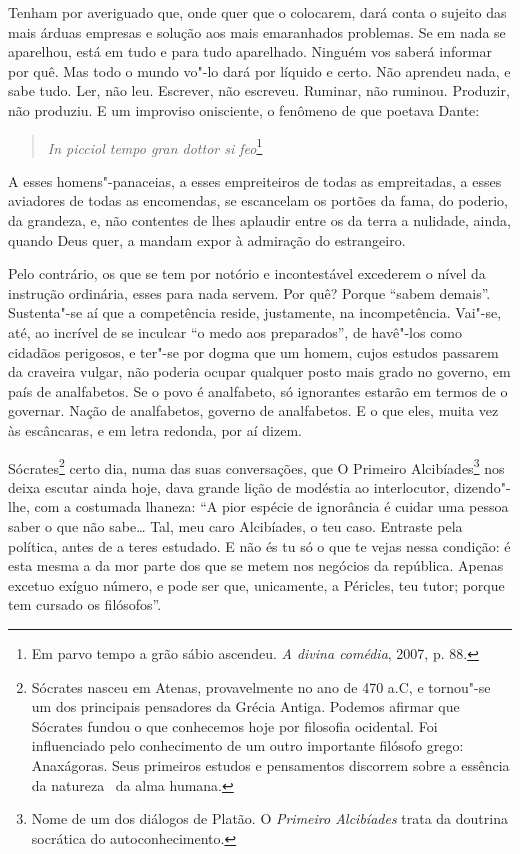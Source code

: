 Tenham por averiguado que, onde quer que o colocarem, dará conta o
sujeito das mais árduas empresas e solução aos mais emaranhados
problemas. Se em nada se aparelhou, está em tudo e para tudo
aparelhado. Ninguém vos saberá informar por quê. Mas todo o mundo vo"-lo
dará por líquido e certo. Não aprendeu nada, e sabe tudo. Ler, não leu.
Escrever, não escreveu. Ruminar, não ruminou. Produzir, não produziu. E
um improviso onisciente, o fenômeno de que poetava Dante:

\begin{verse}
\textit{In picciol tempo gran dottor si feo}\footnote{ Em parvo tempo 
a grão sábio ascendeu.  
\textit{A divina comédia}, 2007, p. 88.} 
\end{verse}
 

A esses homens"-panaceias, a esses empreiteiros de todas as
empreitadas, a esses aviadores de todas as encomendas, se escancelam os
portões da fama, do poderio, da grandeza, e, não contentes de lhes
aplaudir entre os da terra a nulidade, ainda, quando Deus quer, a
mandam expor à admiração do estrangeiro.

Pelo contrário, os que se tem por notório e incontestável
excederem o nível da instrução ordinária, esses para nada servem. Por
quê? Porque ``sabem demais''. Sustenta"-se aí
que a competência reside, justamente, na incompetência. Vai"-se, até, ao
incrível de se inculcar ``o medo aos
preparados'', de havê"-los como cidadãos perigosos, e
ter"-se por dogma que um homem, cujos estudos passarem da craveira
vulgar, não poderia ocupar qualquer posto mais grado no governo, em
país de analfabetos. Se o povo é analfabeto, só ignorantes estarão em
termos de o governar. Nação de analfabetos, governo de analfabetos. E o
que eles, muita vez às escâncaras, e em letra redonda, por aí dizem.

Sócrates\footnote{ Sócrates nasceu em
Atenas, provavelmente no ano de 470 a.C, e
tornou"-se um dos principais pensadores da
Grécia Antiga. Podemos afirmar que Sócrates
fundou o que conhecemos hoje por filosofia
ocidental. Foi influenciado pelo conhecimento de um outro importante
filósofo grego: Anaxágoras. Seus primeiros estudos e pensamentos
discorrem sobre a essência da natureza  da alma humana.} certo dia,
numa das suas conversações, que O Primeiro Alcibíades\footnote{
Nome de um dos diálogos de Platão.  O \textit{Primeiro Alcibíades}
trata da doutrina socrática do autoconhecimento.} nos deixa escutar
ainda hoje, dava grande lição de modéstia ao interlocutor, dizendo"-lhe,
com a costumada lhaneza: ``A pior espécie de ignorância é
cuidar uma pessoa saber o que não sabe\ldots{} Tal, meu caro Alcibíades, o
teu caso. Entraste pela política, antes de a teres estudado. E não és
tu só o que te vejas nessa condição: é esta mesma a da mor parte dos
que se metem nos negócios da república. Apenas excetuo exíguo número, e
pode ser que, unicamente, a Péricles, teu tutor; porque tem cursado os filósofos''.


